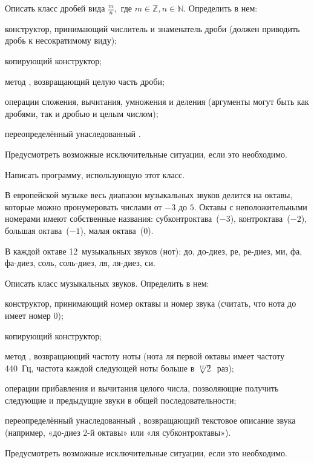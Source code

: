 \task Описать класс  дробей вида $\frac{m}{n},$ где
$m \in \mathbb{Z}, n \in \mathbb{N}$.  Определить в нем:
\begin{itemize*}
\item конструктор, принимающий числитель и знаменатель дроби (должен
  приводить дробь к несократимому виду);
\item копирующий конструктор;
\item метод , возвращающий целую часть дроби;
\item операции сложения, вычитания, умножения и деления (аргументы
  могут быть как дробями, так и дробью и целым числом);
\item переопределённый унаследованный .
\end{itemize*}

Предусмотреть возможные исключительные ситуации, если это необходимо.

Написать программу, использующую этот класс.

\task В европейской музыке весь диапазон музыкальных
звуков делится на октавы, которые можно
пронумеровать числами от $-3$ до $5$. Октавы с неположительными
номерами имеют собственные названия: субконтроктава~($-3$),
контроктава~($-2$), большая октава~($-1$), малая октава~($0$).

В каждой октаве 12~музыкальных звуков (нот): до, до-диез, ре, ре-диез,
ми, фа, фа-диез, соль, соль-диез, ля, ля-диез, си.

Описать класс  музыкальных звуков. Определить в нем:
\begin{itemize*}
\item конструктор, принимающий номер октавы и номер звука (считать,
  что нота до имеет номер $0$);
\item копирующий конструктор;
\item метод , возвращающий частоту ноты (нота ля первой
  октавы имеет частоту 440~Гц, частота каждой следующей ноты больше в
  $\sqrt[12]{2}$~раз);
\item операции прибавления и вычитания целого числа, позволяющие
  получить следующие и предыдущие звуки в общей последовательности;
\item переопределённый унаследованный , возвращающий текстовое
  описание звука (например, «до-диез 2-й октавы» или «ля
  субконтроктавы»).
\end{itemize*}

Предусмотреть возможные исключительные ситуации, если это необходимо.

